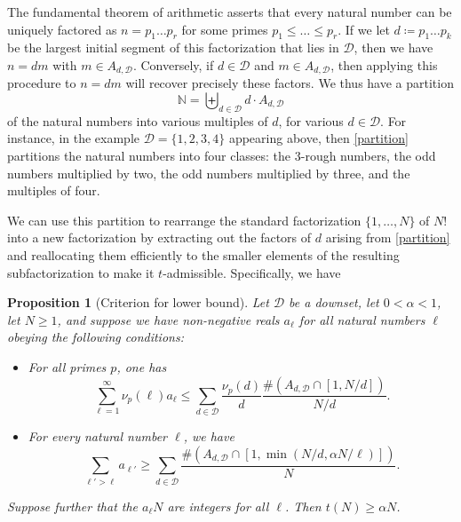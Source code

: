 \documentclass[12pt,a4paper,reqno]{amsart}
\numberwithin{equation}{section}
\theoremstyle{plain}
\newtheorem{proposition}[theorem]{Proposition}
\theoremstyle{definition}
\newcommand\N{\mathbb{N}}
\begin{document}
The fundamental theorem of arithmetic asserts that every natural number can be uniquely factored as $n = p_1 \dots p_r$ for some primes $p_1 \leq \dots \leq p_r$.  If we let $d \coloneqq p_1 \dots p_k$ be the largest initial segment of this factorization that lies in ${\mathcal D}$, then we have $n=dm$ with $m \in A_{d,{\mathcal D}}$.  Conversely, if $d \in {\mathcal D}$ and $m \in A_{d,{\mathcal D}}$, then applying this procedure to $n=dm$ will recover precisely these factors.  We thus have a partition
\begin{equation}\label{partition}
 \N = \biguplus_{d \in {\mathcal D}} d \cdot A_{d,{\mathcal D}}
\end{equation}
of the natural numbers into various multiples of $d$, for various $d \in {\mathcal D}$.  For instance, in the example ${\mathcal D} = \{1,2,3,4\}$ appearing above, then \eqref{partition} partitions the natural numbers into four classes: the $3$-rough numbers, the odd numbers multiplied by two, the odd numbers multiplied by three, and the multiples of four.

We can use this partition to rearrange the standard factorization $\{1,\dots,N\}$ of $N!$ into a new factorization by extracting out the factors of $d$ arising from \eqref{partition} and reallocating them efficiently to the smaller elements of the resulting subfactorization to make it $t$-admissible.  Specifically, we have

\begin{proposition}[Criterion for lower bound]\label{rearrange-crit}  Let ${\mathcal D}$ be a downset, let $0 < \alpha < 1$, let $N \geq 1$, and suppose we have non-negative reals $a_\ell$ for all natural numbers $\ell$ obeying the following conditions:
  \begin{itemize}
  \item[(i)]  For all primes $p$, one has
  \begin{equation}\label{i-eq-1}
     \sum_{\ell=1}^\infty \nu_p(\ell) a_\ell  \leq \sum_{d \in {\mathcal D}} \frac{\nu_p(d)}{d} \frac{\# (A_{d,{\mathcal D}} \cap [1,N/d])}{N/d}.
  \end{equation}
  \item[(ii)]  For every natural number $\ell$, we have
  \begin{equation}\label{l-eq-1} \sum_{\ell' > \ell} a_{\ell'} \geq \sum_{d \in {\mathcal D}} \frac{\# (A_{d,{\mathcal D}} \cap [1,\min(N/d, \alpha N/\ell)])}{N}.
  \end{equation}
  \end{itemize}
  Suppose further that the $a_\ell N$ are integers for all $\ell$.   Then $t(N) \geq \alpha N$.
  \end{proposition}
\end{document}
